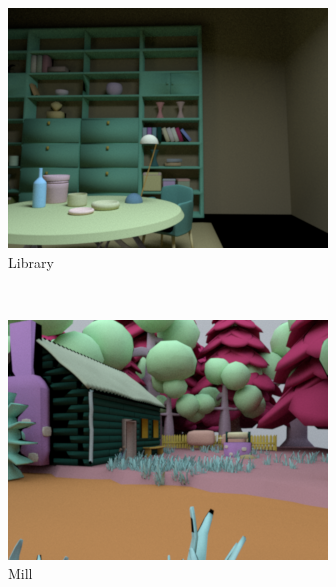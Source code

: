 \documentclass{jov}
\begin{document}
\begin{figure}[t]
\centering
\begin{subfigure}[b]{0.22 \textwidth}
        \includegraphics[width=\textwidth]{../Figures/Figure3/Figure3_a.png}
        \caption{Library }
        \label{fig:baseSceneLibrary}
    \end{subfigure}
    ~
    \begin{subfigure}[b]{0.22 \textwidth}
        \includegraphics[width=\textwidth]{../Figures/Figure3/Figure3_b.png}
        \caption{Mill}
        \label{fig:baseSceneMill}
    \end{subfigure}    
    ~
    \begin{subfigure}[b]{0.22 \textwidth}

\end{subfigure}
\end{figure}
\end{document}
